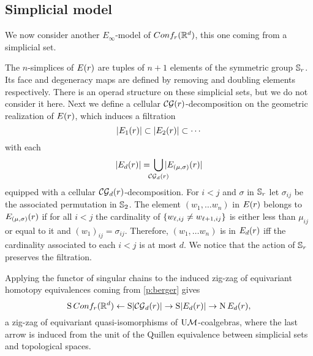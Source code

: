 \subsection{Simplicial model}\label{ss:simplicial model}

We now consider another $E_\infty$-model of $Conf_{r}(\mathbb{R}^{d})$, this one coming from a simplicial set.


The $n$-simplices of $E(r)$ are tuples of $n+1$ elements of the symmetric group $\mathbb{S}_r$.
Its face and degeneracy maps are defined by removing and doubling elements respectively.
There is an operad structure on these simplicial sets, but we do not consider it here.
Next we define a cellular $\mathcal{CG}(r)$-decomposition on the geometric realization of $E(r)$, which induces a filtration
\[
\lvert E_1(r)\rvert \subset \lvert E_2(r)\rvert \subset \dotsb
\]
with each
\[
\bars{\BE_d(r)} = \,
\bigcup_{\mathclap{\CG_d(r)}} \,
\bars{\BE_{(\mu,\sigma)}(r)}
\]
equipped with a cellular $\mathcal{CG}_d(r)$-decomposition.
For $i<j$ and $\sigma$ in $\mathbb{S}_r$ let $\sigma_{ij}$ be the associated permutation in $\mathbb{S}_2$.
The element $(w_1,\dots w_n)$ in $E(r)$ belongs to $E_{(\mu,\sigma)}(r)$ if for all $i<j$ the cardinality of $\{w_{\ell,ij} \neq w_{\ell+1,ij}\}$ is either less than $\mu_{ij}$ or equal to it and $(w_1)_{ij} = \sigma_{ij}$.
Therefore, $(w_1,\dots w_n)$ is in $E_{d}(r)$ iff the cardinality associated to each $i<j$ is at most $d$.
We notice that the action of $\mathbb{S}_r$ preserves the filtration.

Applying the functor of singular chains to the induced zig-zag of equivariant homotopy equivalences coming from \cref{p:berger} gives
\begin{equation}\label{eq:simplicial zig-zag}
	\operatorname{S}Conf_{r}(\mathbb{R}^{d}) \leftarrow
	\operatorname{S}\lvert\mathcal{CG}_d(r)\rvert \to
	\operatorname{S}\lvert E_d(r)\rvert \to
	\operatorname{N} E_d(r),
\end{equation}
a zig-zag of equivariant quasi-isomorphisms of $\mathrm{U}\mathcal{M}$-coalgebras, where the last arrow is induced from the unit of the Quillen equivalence between simplicial sets and topological spaces.

